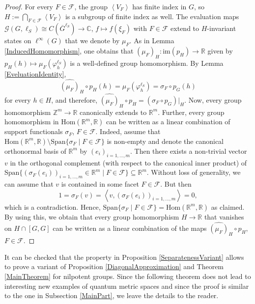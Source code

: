 \documentclass[a4paper,11pt,reqno]{amsart}
\numberwithin{equation}{section}
\numberwithin{equation}{section}
\theoremstyle{definition}
\theoremstyle{remark}
\theoremstyle{remark}
\begin{document}
\begin{proof} For every $F\in\mathcal{F}$, the group $\left\langle V_{F}\right\rangle $
has finite index in $G$, so $H:=\bigcap_{F\in\mathcal{F}}\left\langle V_{F}\right\rangle $
is a subgroup of finite index as well. The evaluation maps $\mathcal{G}(G,\ell_{S})\cong C(\overline{G}^{\ell_{S}})\rightarrow\mathbb{C}$,
$f\mapsto f(\xi_{F})$ with $F\in\mathcal{F}$ extend to $H$-invariant
states on $\ell^{\infty}(G)$ that we denote by $\mu_{F}$. As in
Lemma \ref{InducedHomomorphism}, one obtains that $(\widehat{\mu_{F}})_{H}:\text{im}(p_{H})\rightarrow\mathbb{R}$
given by $p_{H}(h)\mapsto\mu_{F}(\varphi_{h}^{\ell_{S}})$ is a well-defined
group homomorphism. By Lemma \ref{EveluationIdentity},
\[
\widehat{(\mu_{F})}_{H}\circ p_{H}(h)=\mu_{F}(\varphi_{h}^{\ell_{S}})=\sigma_{F}\circ p_{G}(h)
\]
for every $h\in H$, and therefore, $\widehat{(\mu_{F})}_{H}\circ p_{H}=(\sigma_{F}\circ p_{G})|_{H}$.
Now, every group homomorphism $\mathbb{Z}^{m}\rightarrow\mathbb{R}$
canonically extends to $\mathbb{R}^{m}$. Further, every group homomorphism
in $\text{Hom}(\mathbb{R}^{m},\mathbb{R})$ can be written as a linear
combination of support functionals $\sigma_{F}$, $F\in\mathcal{F}$.
Indeed, assume that $\text{Hom}(\mathbb{R}^{m},\mathbb{R})\setminus\text{Span}\{\sigma_{F}\mid F\in\mathcal{F}\}$
is non-empty and denote the canonical orthonormal basis of $\mathbb{R}^{m}$
by $(e_{i})_{i=1,...,m}$. Then there exists a non-trivial vector
$v$ in the orthogonal complement (with respect to the canonical inner product) of $\text{Span}\{(\sigma_{F}(e_{i}))_{i=1,...,m}\in\mathbb{R}^{m}\mid F\in\mathcal{F}\}\subseteq\mathbb{R}^{m}$.
Without loss of generality, we can assume that $v$ is contained in
some facet $F\in\mathcal{F}$. But then 
\[
1=\sigma_{F}(v)=\left\langle v,(\sigma_{F}(e_{i}))_{i=1,...,m}\right\rangle =0,
\]
which is a contradiction. Hence, $\text{Span}\{\sigma_{F}\mid F\in\mathcal{F}\}=\text{Hom}(\mathbb{R}^{m},\mathbb{R})$
as claimed. By using this, we obtain that every group homomorphism
$H\rightarrow\mathbb{R}$ that vanishes on $H\cap[G,G]$ can be written
as a linear combination of the maps $\widehat{(\mu_{F})}_{H}\circ p_{H}$,
$F\in\mathcal{F}$. \end{proof}

It can be checked that the property in Proposition \ref{SeparatenessVariant}
allows to prove a variant of Proposition \ref{DiagonalApproximation}
and Theorem \ref{MainTheorem} for nilpotent groups. Since the following theorem does not
lead to interesting new examples of quantum metric spaces and since
the proof is similar to the one in Subsection \ref{MainPart}, we
leave the details to the reader.
\end{document}
